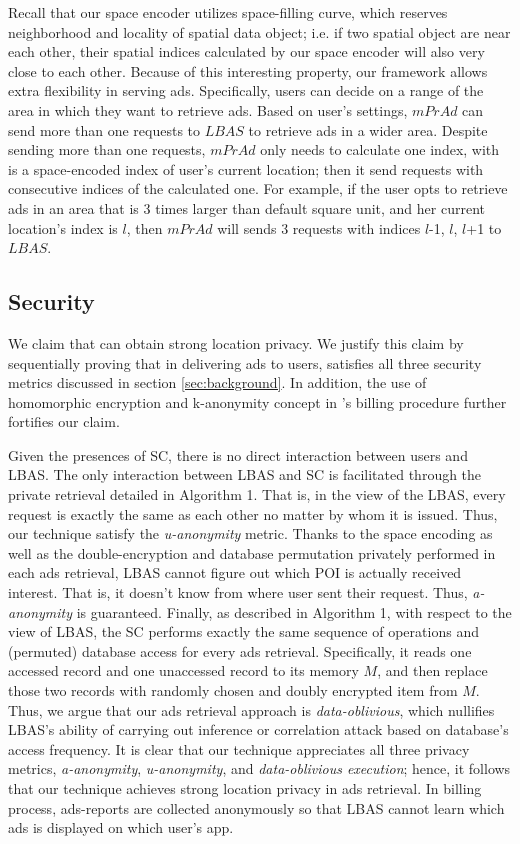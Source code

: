 Recall that our space encoder utilizes space-filling curve, which reserves neighborhood and locality of spatial data object; i.e. if two spatial object are near each other, their spatial indices calculated by our space encoder will also very close to each other. Because of this interesting property, our framework allows extra flexibility in serving ads. Specifically, users can decide on a range of the area in which they want to retrieve ads. Based on user's settings, $mPrAd$ can send more than one requests to $LBAS$ to retrieve ads in a wider area. Despite sending more than one requests, $mPrAd$ only needs to calculate one index, with is a space-encoded index of user's current location; then it send requests with consecutive indices of the calculated one. For example, if the user opts to retrieve ads in an area that is 3 times larger than default square unit, and her current location's index is $l$, then $mPrAd$ will sends 3 requests with indices $l$-1, $l$, $l$+1 to $LBAS$.




\subsection{Security}
We claim that \codename can obtain strong location privacy. We justify this claim by sequentially proving that in delivering ads to users, \codename satisfies all three security metrics discussed in section \ref{sec:background}. In addition, the use of homomorphic encryption and k-anonymity concept in \codename 's billing procedure further fortifies our claim.

Given the presences of SC, there is no direct interaction between users and LBAS. The only interaction between LBAS and SC is facilitated through the private retrieval detailed in Algorithm 1. That is, in the view of the LBAS, every request is exactly the same as each other no matter by whom it is issued. Thus, our technique satisfy the \textit{u-anonymity} metric.
Thanks to the space encoding as well as the double-encryption and database permutation privately performed in each ads retrieval, LBAS cannot figure out which POI is actually received interest. That is, it doesn't know from where user sent their request. Thus, \textit{a-anonymity} is guaranteed. 
Finally, as described in Algorithm 1, with respect to the view of LBAS, the SC performs exactly the same sequence of operations and (permuted) database access for every ads retrieval. Specifically, it reads one accessed record and one unaccessed record to its memory $M$, and then replace those two records with randomly chosen and doubly encrypted item from $M$. Thus, we argue that our ads retrieval approach is \textit{data-oblivious}, which nullifies LBAS's ability of carrying out inference or correlation attack based on database's access frequency. It is clear that our technique appreciates all three privacy metrics, \textit{a-anonymity}, \textit{u-anonymity}, and \textit{data-oblivious execution}; hence, it follows that our technique achieves strong location privacy in ads retrieval. In billing process, ads-reports are collected anonymously so that LBAS cannot learn which ads is displayed on which user's app. 

